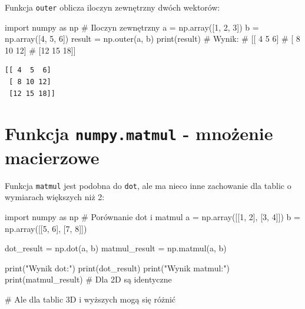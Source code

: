 \documentclass[
  polish,
  letterpaper,
  DIV=11,
  numbers=noendperiod]{scrreprt}
\newenvironment{Shaded}{\begin{snugshade}}{\end{snugshade}}
\newcommand{\BuiltInTok}[1]{\textcolor[rgb]{0.00,0.23,0.31}{#1}}
\newcommand{\CommentTok}[1]{\textcolor[rgb]{0.37,0.37,0.37}{#1}}
\newcommand{\DecValTok}[1]{\textcolor[rgb]{0.68,0.00,0.00}{#1}}
\newcommand{\ImportTok}[1]{\textcolor[rgb]{0.00,0.46,0.62}{#1}}
\newcommand{\NormalTok}[1]{\textcolor[rgb]{0.00,0.23,0.31}{#1}}
\newcommand{\OperatorTok}[1]{\textcolor[rgb]{0.37,0.37,0.37}{#1}}
\newcommand{\StringTok}[1]{\textcolor[rgb]{0.13,0.47,0.30}{#1}}
\begin{document}
Funkcja \texttt{outer} oblicza iloczyn zewnętrzny dwóch wektorów:

\begin{Shaded}
\begin{Highlighting}[]
\ImportTok{import}\NormalTok{ numpy }\ImportTok{as}\NormalTok{ np}
\CommentTok{\# Iloczyn zewnętrzny}
\NormalTok{a }\OperatorTok{=}\NormalTok{ np.array([}\DecValTok{1}\NormalTok{, }\DecValTok{2}\NormalTok{, }\DecValTok{3}\NormalTok{])}
\NormalTok{b }\OperatorTok{=}\NormalTok{ np.array([}\DecValTok{4}\NormalTok{, }\DecValTok{5}\NormalTok{, }\DecValTok{6}\NormalTok{])}
\NormalTok{result }\OperatorTok{=}\NormalTok{ np.outer(a, b)}
\BuiltInTok{print}\NormalTok{(result)}
\CommentTok{\# Wynik:}
\CommentTok{\# [[ 4  5  6]}
\CommentTok{\#  [ 8 10 12]}
\CommentTok{\#  [12 15 18]]}
\end{Highlighting}
\end{Shaded}

\begin{verbatim}
[[ 4  5  6]
 [ 8 10 12]
 [12 15 18]]
\end{verbatim}

\section{\texorpdfstring{Funkcja \texttt{numpy.matmul} - mnożenie
macierzowe}{Funkcja numpy.matmul - mnożenie macierzowe}}\label{funkcja-numpy.matmul---mnoux17cenie-macierzowe}

Funkcja \texttt{matmul} jest podobna do \texttt{dot}, ale ma nieco inne
zachowanie dla tablic o wymiarach większych niż 2:

\begin{Shaded}
\begin{Highlighting}[]
\ImportTok{import}\NormalTok{ numpy }\ImportTok{as}\NormalTok{ np}
\CommentTok{\# Porównanie dot i matmul}
\NormalTok{a }\OperatorTok{=}\NormalTok{ np.array([[}\DecValTok{1}\NormalTok{, }\DecValTok{2}\NormalTok{], [}\DecValTok{3}\NormalTok{, }\DecValTok{4}\NormalTok{]])}
\NormalTok{b }\OperatorTok{=}\NormalTok{ np.array([[}\DecValTok{5}\NormalTok{, }\DecValTok{6}\NormalTok{], [}\DecValTok{7}\NormalTok{, }\DecValTok{8}\NormalTok{]])}

\NormalTok{dot\_result }\OperatorTok{=}\NormalTok{ np.dot(a, b)}
\NormalTok{matmul\_result }\OperatorTok{=}\NormalTok{ np.matmul(a, b)}

\BuiltInTok{print}\NormalTok{(}\StringTok{"Wynik dot:"}\NormalTok{)}
\BuiltInTok{print}\NormalTok{(dot\_result)}
\BuiltInTok{print}\NormalTok{(}\StringTok{"Wynik matmul:"}\NormalTok{)}
\BuiltInTok{print}\NormalTok{(matmul\_result)}
\CommentTok{\# Dla 2D są identyczne}

\CommentTok{\# Ale dla tablic 3D i wyższych mogą się różnić}
\end{Highlighting}
\end{Shaded}
\end{document}
